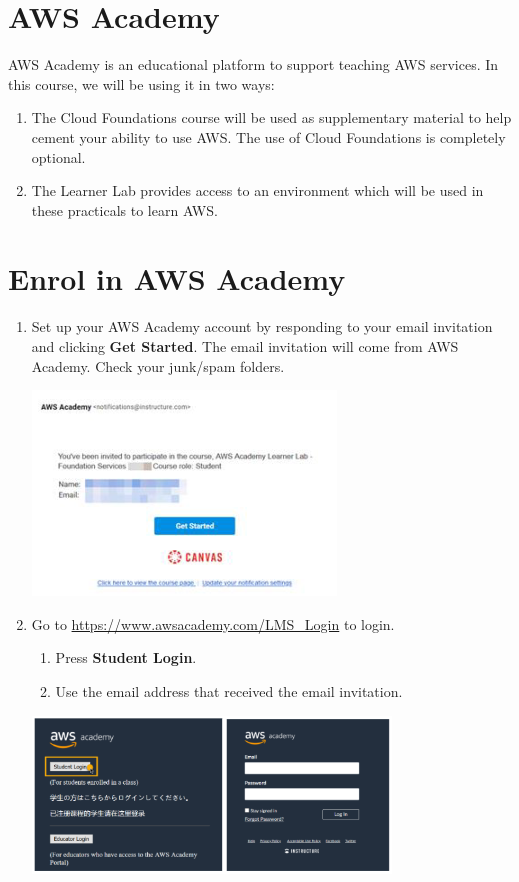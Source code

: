 \documentclass{csse4400}
\begin{document}
\section{AWS Academy}
AWS Academy is an educational platform to support teaching AWS services.
In this course, we will be using it in two ways:
\begin{enumerate}
    \item The Cloud Foundations course will be used as supplementary material to help cement your ability to use AWS.
          The use of Cloud Foundations is completely optional.
    \item The Learner Lab provides access to an environment which will be used in these practicals to learn AWS. 
\end{enumerate}

\section{Enrol in AWS Academy}

\begin{enumerate}
    \item
        Set up your AWS Academy account by responding to your email invitation and clicking \textbf{Get Started}.
        The email invitation will come from AWS Academy.
        Check your junk/spam folders.

        \includegraphics{images/email-invite}

    \item Go to \url{https://www.awsacademy.com/LMS_Login} to login.
    \begin{enumerate}
        \item Press \textbf{Student Login}.
        \item Use the email address that received the email invitation.
    \end{enumerate}

    \includegraphics[width=0.75\textwidth]{images/labs-login}
\end{enumerate}
\end{document}
